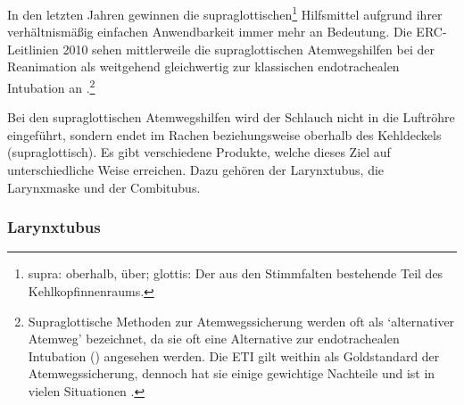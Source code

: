 {In den letzten Jahren gewinnen die
supraglottischen\footnote{ supra: oberhalb, über;
 glottis: Der aus den Stimmfalten bestehende
Teil des Kehlkopfinnenraums.} Hilfsmittel aufgrund ihrer
verhältnismäßig einfachen Anwendbarkeit immer mehr an
Bedeutung. Die ERC-Leitlinien 2010 sehen mittlerweile die
supraglottischen Atemwegshilfen bei der Reanimation als
weitgehend gleichwertig zur klassischen endotrachealen
Intubation an
\cite[p.1319,1321]{Erc2010Sec4}.\footnote{Supraglottische
Methoden zur Atemwegssicherung werden oft als
\enquote*{alternativer Atemweg} bezeichnet, da sie oft eine
Alternative zur endotrachealen Intubation ()
angesehen werden. Die ETI gilt weithin als Goldstandard der
Atemwegssicherung, dennoch hat sie einige gewichtige
Nachteile und ist in vielen Situationen . }

Bei den supraglottischen Atemwegshilfen wird der Schlauch
nicht in die Luftröhre eingeführt, sondern endet im Rachen
beziehungsweise oberhalb des Kehldeckels (supraglottisch).
Es gibt verschiedene Produkte, welche dieses Ziel auf
unterschiedliche Weise erreichen. Dazu gehören der
Larynxtubus{\texttrademark}, die Larynxmaske und der Combitubus.

 }{}{}{}{}{}


\subsubsection{Larynxtubus{\texttrademark}}

